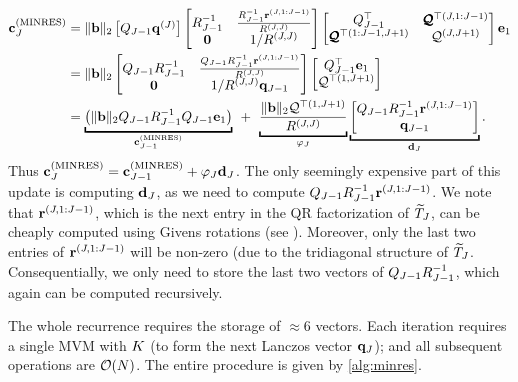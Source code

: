 \begin{align}
  \bc_J^{(\text{MINRES})} &=
  \Vert \bb \Vert_2 \begin{bmatrix}
    \bQ_{J-1} \bq^{(J)}
  \end{bmatrix} \begin{bmatrix}
    \bR_{J-1}^{-1} & \frac{ \bR_{J-1}^{-1} {\br^{(J,1:J-1)}} }{ R^{(J,J)} } \\
    \bzero & 1 / R^{(J,J)}
  \end{bmatrix} \begin{bmatrix}
    \bQU_{J-1}^\top & \bqu^{\top(J,1:J-1)} \\
    \bqu^{\top{(1:J-1,J+1)}} & \mathcal{Q}^{(J,J+1)}
  \end{bmatrix} \be_1
  \nonumber \\
  &=
  \Vert \bb \Vert_2
  \begin{bmatrix}
    \bQ_{J-1} \bR_{J-1}^{-1} & \frac{ \bQ_{J-1} \bR_{J-1}^{-1} {\br^{(J,1:J-1)}} }{ R^{(J,J)} } \\
    \bzero & 1 / R^{(J,J)} \bq_{J-1}
  \end{bmatrix} \begin{bmatrix}
    \bQU_{J-1}^\top \be_1
    \\
    \mathcal{Q}^{\top{(1,J+1)}}
  \end{bmatrix}
  \nonumber \\
  &=
  \underbracket{\left( \Vert \bb \Vert_2 \bQ_{J-1} \bR_{J-1}^{-1} \bQU_{J-1} \be_1 \right)}_{\bc_{J-1}^{(\text{MINRES})}}
  \:\: + \:\:
  \underbracket{\frac{\Vert \bb \Vert_2 \mathcal{Q}^{\top{(1,J+1)}}}{ R^{(J,J) }}}_{\varphi_J}
  \underbracket{\begin{bmatrix}
    \bQ_{J-1} \bR_{J-1}^{-1} {\br^{(J,1:J-1)}}  \\
    \bq_{J-1}
  \end{bmatrix}}_{\bd_J}.
  \label{eqn:minres_descent}
\end{align}
%
Thus $\mathbf{c}^{(\text{MINRES})}_J = \mathbf{c}^{(\text{MINRES})}_{J-1} + \varphi_J \mathbf{d}_J$.
The only seemingly expensive part of this update is computing $\mathbf{d}_J$, as we need to compute $Q_{J-1} R^{-1}_{J-1} \mathbf{r}^{(J,1:J-1)}$.
We note that $\mathbf{r}^{(J,1:J-1)}$, which is the next entry in the QR factorization of $\widetilde {T}_J$, can be cheaply computed using Givens rotations (see \citep[e.g.][Ch. 11.4.1]{golub2012matrix}).
Moreover, only the last two entries of $\mathbf{r}^{(J,1:J-1)}$ will be non-zero (due to the tridiagonal structure of $\widetilde {T}_J$.
Consequentially, we only need to store the last two vectors of $Q_{J-1} R^{-1}_{J-1}$, which again can be computed recursively.

The whole recurrence requires the storage of $\approx 6$ vectors.
Each iteration requires a single MVM with $K$ (to form the next Lanczos vector $\mathbf{q}_J$); and all subsequent operations are $\bigo{N}$.
The entire procedure is given by \cref{alg:minres}.


